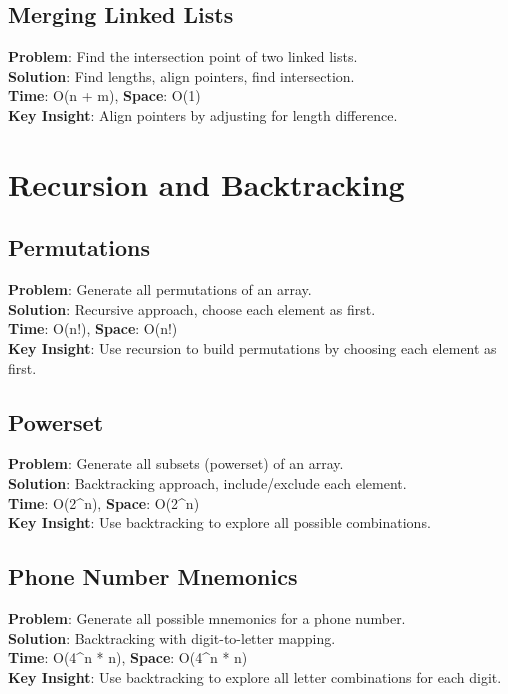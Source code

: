 \documentclass{report}
\begin{document}
\subsection{Merging Linked Lists}
\textbf{Problem}: Find the intersection point of two linked lists.\\
\textbf{Solution}: Find lengths, align pointers, find intersection.\\
\textbf{Time}: O(n + m), \textbf{Space}: O(1)\\
\textbf{Key Insight}: Align pointers by adjusting for length difference.

\section{Recursion and Backtracking}

\subsection{Permutations}
\textbf{Problem}: Generate all permutations of an array.\\
\textbf{Solution}: Recursive approach, choose each element as first.\\
\textbf{Time}: O(n!), \textbf{Space}: O(n!)\\
\textbf{Key Insight}: Use recursion to build permutations by choosing each element as first.

\subsection{Powerset}
\textbf{Problem}: Generate all subsets (powerset) of an array.\\
\textbf{Solution}: Backtracking approach, include/exclude each element.\\
\textbf{Time}: O(2\textasciicircum n), \textbf{Space}: O(2\textasciicircum n)\\
\textbf{Key Insight}: Use backtracking to explore all possible combinations.

\subsection{Phone Number Mnemonics}
\textbf{Problem}: Generate all possible mnemonics for a phone number.\\
\textbf{Solution}: Backtracking with digit-to-letter mapping.\\
\textbf{Time}: O(4\textasciicircum n * n), \textbf{Space}: O(4\textasciicircum n * n)\\
\textbf{Key Insight}: Use backtracking to explore all letter combinations for each digit.
\end{document}
